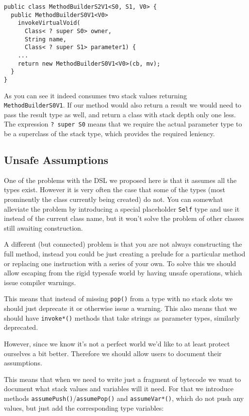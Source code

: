 \documentclass{sig-alternate}
\begin{document}
\begin{verbatim}
public class MethodBuilderS2V1<S0, S1, V0> {
  public MethodBuilderS0V1<V0> 
    invokeVirtualVoid(
      Class< ? super S0> owner, 
      String name, 
      Class< ? super S1> parameter1) {
    ...    
    return new MethodBuilderS0V1<V0>(cb, mv);
  }
}
\end{verbatim}

As you can see it indeed consumes two stack values returning \verb!MethodBuilderS0V1!. If our method would also return a result we would need to pass the result type as well, and return a class with stack depth only one less. The expression \verb!? super S0! means that we require the actual parameter type to be a superclass of the stack type, which provides the required leniency.

\subsection{Unsafe Assumptions}

One of the problems with the DSL we proposed here is that it assumes all the types exist. However it is very often the case that some of the types (most prominently the class currently being created) do not. You can somewhat alleviate the problem by introducing a special placeholder \verb!Self! type and use it instead of the current class name, but it won't solve the problem of other classes still awaiting construction.

A different (but connected) problem is that you are not always constructing the full method, instead you could be just creating a prelude for a particular method or replacing one instruction with a series of your own. To solve this we should allow escaping from the rigid typesafe world by having unsafe operations, which issue compiler warnings.

This means that instead of missing \verb!pop()! from a type with no stack slots we should just deprecate it or otherwise issue a warning. This also means that we should have \verb!invoke*()! methods that take strings as parameter types, similarly deprecated.

However, since we know it's not a perfect world we'd like to at least protect ourselves a bit better. Therefore we should allow users to document their assumptions.

This means that when we need to write just a fragment of bytecode we want to document what stack values and variables will it need. For that we introduce methods \verb!assumePush()!/\verb!assumePop()! and \verb!assumeVar*()!, which do not push any values, but just add the corresponding type variables:
\end{document}
